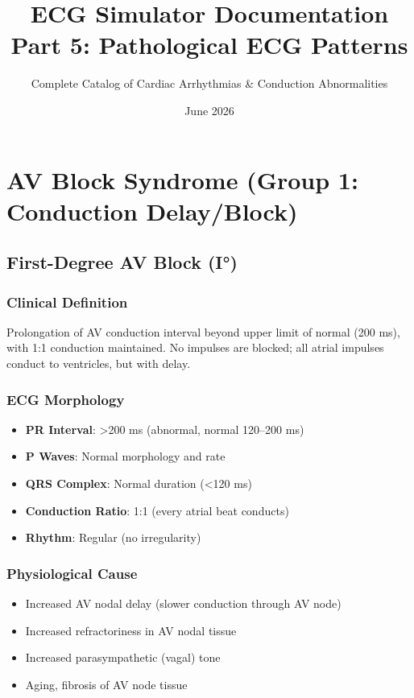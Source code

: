 \documentclass[11pt, a4paper]{article}
\title{ECG Simulator Documentation\\Part 5: Pathological ECG Patterns}
\author{Complete Catalog of Cardiac Arrhythmias \& Conduction Abnormalities}
\date{June 2026}
\begin{document}
\maketitle

\tableofcontents
\newpage

\section{AV Block Syndrome (Group 1: Conduction Delay/Block)}

\subsection{First-Degree AV Block (I°)}

\subsubsection{Clinical Definition}
Prolongation of AV conduction interval beyond upper limit of normal (200 ms), with 1:1 conduction maintained. No impulses are blocked; all atrial impulses conduct to ventricles, but with delay.

\subsubsection{ECG Morphology}
\begin{itemize}
    \item \textbf{PR Interval}: >200 ms (abnormal, normal 120--200 ms)
    \item \textbf{P Waves}: Normal morphology and rate
    \item \textbf{QRS Complex}: Normal duration (<120 ms)
    \item \textbf{Conduction Ratio}: 1:1 (every atrial beat conducts)
    \item \textbf{Rhythm}: Regular (no irregularity)
\end{itemize}

\subsubsection{Physiological Cause}
\begin{itemize}
    \item Increased AV nodal delay (slower conduction through AV node)
    \item Increased refractoriness in AV nodal tissue
    \item Increased parasympathetic (vagal) tone
    \item Aging, fibrosis of AV node tissue
\end{itemize}
\end{document}
